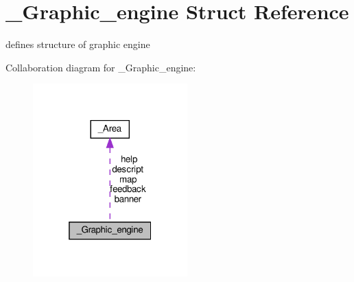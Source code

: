 \hypertarget{struct__Graphic__engine}{}\section{\+\_\+\+Graphic\+\_\+engine Struct Reference}
\label{struct__Graphic__engine}


defines structure of graphic engine  




Collaboration diagram for \+\_\+\+Graphic\+\_\+engine\+:
\nopagebreak
\begin{figure}[H]
\begin{center}
\leavevmode
\includegraphics[width=169pt]{struct__Graphic__engine__coll__graph}
\end{center}
\end{figure}
